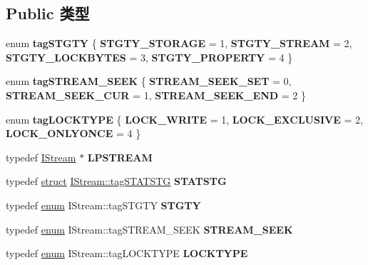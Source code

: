 \subsection*{Public 类型}
\begin{DoxyCompactItemize}
\item 
\mbox{\label{interface_i_stream_a54a3c991a43df261bc305da077a5f43f}} 
enum {\bfseries tag\+S\+T\+G\+TY} \{ {\bfseries S\+T\+G\+T\+Y\+\_\+\+S\+T\+O\+R\+A\+GE} = 1, 
{\bfseries S\+T\+G\+T\+Y\+\_\+\+S\+T\+R\+E\+AM} = 2, 
{\bfseries S\+T\+G\+T\+Y\+\_\+\+L\+O\+C\+K\+B\+Y\+T\+ES} = 3, 
{\bfseries S\+T\+G\+T\+Y\+\_\+\+P\+R\+O\+P\+E\+R\+TY} = 4
 \}
\item 
\mbox{\label{interface_i_stream_a1dbec423101cf058b10681e164ac37b3}} 
enum {\bfseries tag\+S\+T\+R\+E\+A\+M\+\_\+\+S\+E\+EK} \{ {\bfseries S\+T\+R\+E\+A\+M\+\_\+\+S\+E\+E\+K\+\_\+\+S\+ET} = 0, 
{\bfseries S\+T\+R\+E\+A\+M\+\_\+\+S\+E\+E\+K\+\_\+\+C\+UR} = 1, 
{\bfseries S\+T\+R\+E\+A\+M\+\_\+\+S\+E\+E\+K\+\_\+\+E\+ND} = 2
 \}
\item 
\mbox{\label{interface_i_stream_ad106495e0dddb8a64d6a08c207fbb494}} 
enum {\bfseries tag\+L\+O\+C\+K\+T\+Y\+PE} \{ {\bfseries L\+O\+C\+K\+\_\+\+W\+R\+I\+TE} = 1, 
{\bfseries L\+O\+C\+K\+\_\+\+E\+X\+C\+L\+U\+S\+I\+VE} = 2, 
{\bfseries L\+O\+C\+K\+\_\+\+O\+N\+L\+Y\+O\+N\+CE} = 4
 \}
\item 
\mbox{\label{interface_i_stream_a509f4f346c0786398bfe9631a98ede1b}} 
typedef \hyperlink{interface_i_stream}{I\+Stream} $\ast$ {\bfseries L\+P\+S\+T\+R\+E\+AM}
\item 
\mbox{\label{interface_i_stream_aa42cb72505f64f50739f8081a82bce07}} 
typedef \hyperlink{interfacestruct}{struct} \hyperlink{struct_i_stream_1_1tag_s_t_a_t_s_t_g}{I\+Stream\+::tag\+S\+T\+A\+T\+S\+TG} {\bfseries S\+T\+A\+T\+S\+TG}
\item 
\mbox{\label{interface_i_stream_a2a362d5ca4dfd5efdaacf3aaa0019c67}} 
typedef \hyperlink{interfaceenum}{enum} I\+Stream\+::tag\+S\+T\+G\+TY {\bfseries S\+T\+G\+TY}
\item 
\mbox{\label{interface_i_stream_ad0ff81fa4cef1d394f91737406193cee}} 
typedef \hyperlink{interfaceenum}{enum} I\+Stream\+::tag\+S\+T\+R\+E\+A\+M\+\_\+\+S\+E\+EK {\bfseries S\+T\+R\+E\+A\+M\+\_\+\+S\+E\+EK}
\item 
\mbox{\label{interface_i_stream_a08275bdd96dc1e857321b54c41d696f8}} 
typedef \hyperlink{interfaceenum}{enum} I\+Stream\+::tag\+L\+O\+C\+K\+T\+Y\+PE {\bfseries L\+O\+C\+K\+T\+Y\+PE}
\end{DoxyCompactItemize}
